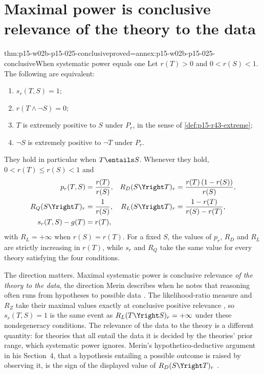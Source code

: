 \section{Maximal power is conclusive relevance of the theory to the data}
\label{sec:p15-w02b-p15-025-conclusive}

\begin{hbtheorem}{thm:p15-w02b-p15-025-conclusive}{proved=annex:p15-w02b-p15-025-conclusive}{When systematic power equals one}
Let \(r(T)>0\) and \(0<r(S)<1\). The following are equivalent:
\begin{enumerate}
\item \(s_r(T,S)=1\);
\item \(r(T\wedge\neg S)=0\);
\item \(T\) is extremely positive to \(S\) under \(P_r\), in the sense
of \cref{def:p15-r43-extreme};
\item \(\neg S\) is extremely positive to \(\neg T\) under \(P_r\).
\end{enumerate}
They hold in particular when \(T\entails S\). Whenever they hold,
\(0<r(T)\le r(S)<1\) and
\[
 \begin{aligned}
 p_r(T,S)&=\frac{r(T)}{r(S)}, &
 R_D(S\Yright T)_r&=\frac{r(T)\,(1-r(S))}{r(S)},\\
 R_Q(S\Yright T)_r&=\frac1{r(S)}, &
 R_L(S\Yright T)_r&=\frac{1-r(T)}{r(S)-r(T)},\\
 s_r(T,S)-g(T)&=r(T),
 \end{aligned}
\]
with \(R_L=+\infty\) when \(r(S)=r(T)\). For a fixed \(S\), the values
of \(p_r\), \(R_D\) and \(R_L\) are strictly increasing in \(r(T)\),
while \(s_r\) and \(R_Q\) take the same value for every theory
satisfying the four conditions.
\end{hbtheorem}

The direction matters. Maximal systematic power is conclusive relevance
\emph{of the theory to the data}, the direction Merin describes when he
notes that reasoning often runs from hypotheses to possible data
\cite[p.~268]{Merin2021Relevance}. The likelihood-ratio measure and
\(R_Z\) take their maximal values exactly at conclusive positive
relevance \cite[p.~272]{Merin2021Relevance}, so \(s_r(T,S)=1\) is the
same event as \(R_L(T\Yright S)_r=+\infty\) under these
nondegeneracy conditions. The relevance of the data to the theory is a
different quantity: for theories that all entail the data it is decided
by the theories' prior range, which systematic power ignores. Merin's
hypothetico-deductive argument in his Section~4, that a hypothesis
entailing a possible outcome is raised by observing it, is the sign of
the displayed value of \(R_D(S\Yright T)_r\)
\cite[pp.~267--268]{Merin2021Relevance}.

